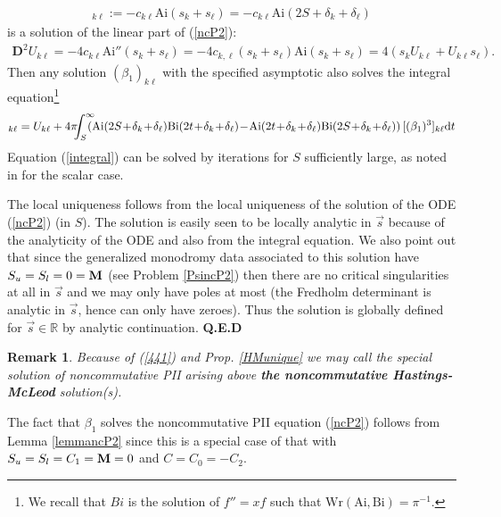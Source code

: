 \documentclass{article}
\newtheorem{remark}{Remark}[section]
\def \D{{\mathbf D}}
\def\b{\beta}
\def\br{\begin{remark}}
\def\er{\end{remark}}
\def\R{{\mathbb R}}
\def\d{{\rm d}}
\def\Ai{\mathrm{Ai}}
\def\Ai{\mathrm{Ai}}
\def\QED{ {\bf Q.E.D}\par \vskip 4pt}
\newcommand{\be}{\begin{eqnarray}}
\newcommand{\ee}{\end{eqnarray}}
\def\le{\left}
\def\ri{\right}
\begin{document}
\be
[U(\vec s)]_{k\ell}:=- c_{k\ell} \Ai(s_k+s_\ell) =- c_{k\ell} \Ai(2S + \delta_k+\delta_\ell) 
\ee
is a solution of the linear part of (\ref{ncP2}):
\be
\D^2 U_{k\ell} = -4 c_{k\ell} \Ai''(s_k+s_\ell) = -4c_{k,\ell} (s_k+s_\ell) \Ai(s_k+s_\ell) = 4( s_kU_{k\ell} + U_{k\ell}s_\ell).
\ee 
Then any  solution $(\b_1)_{k\ell}$ with the specified asymptotic also solves the integral equation\footnote{We recall that $Bi$ is the solution of $f''=xf$ such that $\mathrm{Wr}(\Ai,\mathrm{Bi})=\pi^{-1}$.}
\be
[\b_1]_{k\ell} = U_{k\ell}+4 \pi\!\!\!\int_{S}^\infty \!\!\! \!\!\le(
\Ai(2S\!+\!\delta_k\!+\!\delta_\ell) \mathrm{Bi}(2t\!+\!\delta_k\!+\!\delta_\ell)\! -\! 
\Ai(2t\!+\!\delta_k\!+\! \delta_\ell) \mathrm{Bi}(2S\!+\!\delta_k\!+\!\delta_\ell) \ri) [(\b_1)^3]_{k\ell}\d t\label{integral}
\ee
Equation (\ref{integral}) can be solved by iterations for $S$ sufficiently large, as noted in \cite{Hastings-McLeod} for the scalar case.

The local uniqueness follows from the local uniqueness of the solution of the ODE (\ref{ncP2}) (in $S$).  
The solution is easily seen to be locally analytic in $\vec s$ because of the analyticity of the ODE and also from the integral equation.
We also point out that since the generalized monodromy data associated to this solution have $S_u=S_l=0={\bf M}$ (see Problem \ref{PsincP2}) then there are no critical singularities at all in $\vec s$ and we may only have poles at most (the Fredholm determinant is analytic in $\vec s$, hence can only have zeroes). Thus the solution is globally defined for $\vec s\in \R$ by analytic continuation.
\QED
\br
Because of (\ref{441}) and Prop. \ref{HMunique}  we may call the special solution of noncommutative PII arising  above {\bf the noncommutative Hastings-McLeod} solution(s). 
\er
{}
The fact that $\b_1$ solves the noncommutative PII equation (\ref{ncP2}) follows from Lemma \ref{lemmancP2} since this is a special case of that with $S_u=S_l=C_1={\bf M}=0$ and $C=C_0=-C_2$.
\end{document}
